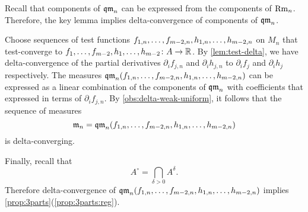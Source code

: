 Recall that components of $\operatorname{\mathfrak{qm}}_n$ can be expressed from the components of $\operatorname{\rm Rm}_n$.
Therefore, the key lemma implies delta-convergence of components of $\operatorname{\mathfrak{qm}}_n$.

Choose sequences of test functions $f_{1,n},\dots,f_{m-2,n},h_{1,n},\zz\dots,h_{m-2,n}$ on $M_n$ that test-converge to $f_{1},\dots,f_{m-2},h_{1},\dots,h_{m-2}\colon A\to \mathbb{R}$.
By \ref{lem:test-delta}, we have delta-convergence of the partial derivatives $\partial_if_{j,n}$ and 
$\partial_ih_{j,n}$ to $\partial_if_{j}$ and 
$\partial_ih_{j}$ respectively.
The measures $\qm_n(f_{1,n},\dots,f_{m-2,n},h_{1,n},\zz\dots,h_{m-2,n})$ 
can be expressed as a linear combination of the components of $\operatorname{\mathfrak{qm}}_n$ with coefficients that expressed in terms of $\partial_if_{j,n}$.
By \ref{obs:delta-weak-uniform}, it follows that the sequence of measures 
\[\mathfrak m_n=\qm_n(f_{1,n},\dots,f_{m-2,n},h_{1,n},\zz\dots,h_{m-2,n})\]
is delta-converging.

Finally, recall that 
\[A^\circ=\bigcap_{\delta>0}A^\delta.\]
Therefore delta-convergence of $\qm_n(f_{1,n},\dots,f_{m-2,n},h_{1,n},\zz\dots,h_{m-2,n})$ implies \ref{prop:3parts}(\ref{prop:3parts:reg}).
\qeds
